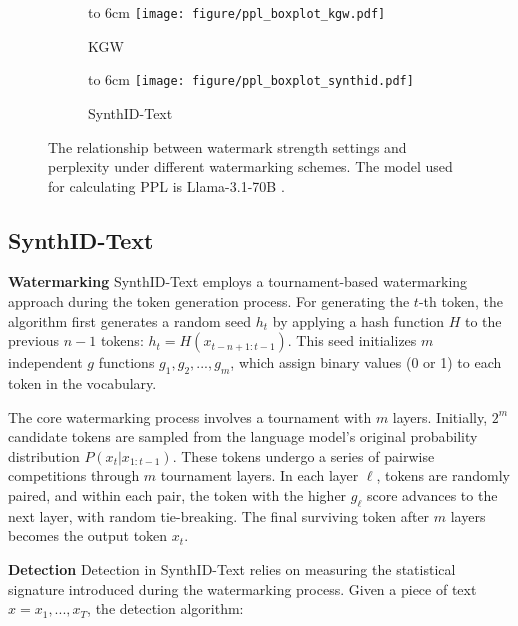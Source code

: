 \begin{figure}[t]
\centering
\begin{subfigure}[t]{0.48\textwidth}
\centering
\vbox to 6cm{
\vfill
\texttt{[image: figure/ppl\_boxplot\_kgw.pdf]}
\vfill
}
\caption{KGW}
\label{fig:perplexity_kgw}
\end{subfigure}
\hfill
\begin{subfigure}[t]{0.48\textwidth}
\centering
\vbox to 6cm{
\vfill
\texttt{[image: figure/ppl\_boxplot\_synthid.pdf]}
\vfill
}
\caption{SynthID-Text}
\label{fig:perplexity_synthid}
\end{subfigure}
\caption{The relationship between watermark strength settings and perplexity under different watermarking schemes. The model used for calculating PPL is Llama-3.1-70B \cite{dubey2024llama}.}
\label{fig:perplexity}
\end{figure}

\subsection{SynthID-Text}
\noindent\textbf{Watermarking} \quad SynthID-Text \cite{Dathathri2024} employs a tournament-based watermarking approach during the token generation process. For generating the $t$-th token, the algorithm first generates a random seed $h_t$ by applying a hash function $H$ to the previous $n-1$ tokens: $h_t = H(x_{t-n+1:t-1})$. This seed initializes $m$ independent $g$ functions $g_1, g_2, ..., g_m$, which assign binary values (0 or 1) to each token in the vocabulary.

The core watermarking process involves a tournament with $m$ layers. Initially, $2^m$ candidate tokens are sampled from the language model's original probability distribution $P(x_t|x_{1:t-1})$. These tokens undergo a series of pairwise competitions through $m$ tournament layers. In each layer $\ell$, tokens are randomly paired, and within each pair, the token with the higher $g_\ell$ score advances to the next layer, with random tie-breaking. The final surviving token after $m$ layers becomes the output token $x_t$.

\vspace{3pt}

\noindent\textbf{Detection} \quad Detection in SynthID-Text relies on measuring the statistical signature introduced during the watermarking process. Given a piece of text $x = x_1,...,x_T$, the detection algorithm:

